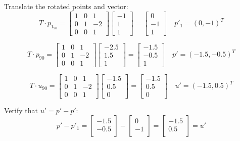 \documentclass[tikz,14pt,fleqn]{article}
\begin{document}
Translate the rotated points and vector:
\[
T \cdot p_{1_{90}}=
\begin{bmatrix}
1 & 0 & 1\\
0 & 1 & -2\\
0 & 0 & 1
\end{bmatrix}
\begin{bmatrix}
-1\\
1\\
1
\end{bmatrix}=
\begin{bmatrix}
0\\
-1\\
1
\end{bmatrix}
\quad p'_1 = (0,-1)^T
\]

\[
T \cdot p_{90}=
\begin{bmatrix}
1 & 0 & 1\\
0 & 1 & -2\\
0 & 0 & 1
\end{bmatrix}
\begin{bmatrix}
-2.5\\
1.5\\
1
\end{bmatrix}=
\begin{bmatrix}
-1.5\\
-0.5\\
1
\end{bmatrix}
\quad p' = (-1.5,-0.5)^T
\]

\[
T \cdot u_{90}=
\begin{bmatrix}
1 & 0 & 1\\
0 & 1 & -2\\
0 & 0 & 1
\end{bmatrix}
\begin{bmatrix}
-1.5\\
0.5\\
0
\end{bmatrix}=
\begin{bmatrix}
-1.5\\
0.5\\
0
\end{bmatrix}
\quad u' = (-1.5,0.5)^T
\]

Verify that $u' = p' - p'$:
\[
   p' - p'_1
   =
   \begin{bmatrix}
   -1.5\\
   -0.5\\
   \end{bmatrix}
   -
   \begin{bmatrix}
   0\\
   -1\\
   \end{bmatrix}
   =
   \begin{bmatrix}
   -1.5\\
   0.5\\
   \end{bmatrix}
   =
   u'
\]
\end{document}
